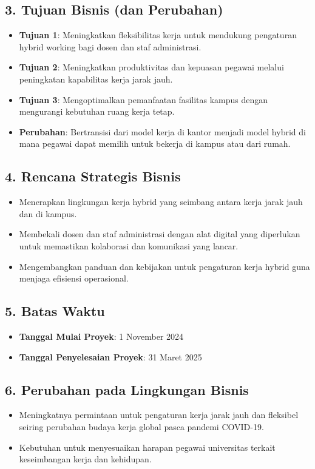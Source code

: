 \subsection*{3. Tujuan Bisnis (dan Perubahan)}
\begin{itemize}
	\item \textbf{Tujuan 1}: Meningkatkan fleksibilitas kerja untuk mendukung pengaturan hybrid working bagi dosen dan staf administrasi.
	\item \textbf{Tujuan 2}: Meningkatkan produktivitas dan kepuasan pegawai melalui peningkatan kapabilitas kerja jarak jauh.
	\item \textbf{Tujuan 3}: Mengoptimalkan pemanfaatan fasilitas kampus dengan mengurangi kebutuhan ruang kerja tetap.
	\item \textbf{Perubahan}: Bertransisi dari model kerja di kantor menjadi model hybrid di mana pegawai dapat memilih untuk bekerja di kampus atau dari rumah.
\end{itemize}

\subsection*{4. Rencana Strategis Bisnis}
\begin{itemize}
	\item Menerapkan lingkungan kerja hybrid yang seimbang antara kerja jarak jauh dan di kampus.
	\item Membekali dosen dan staf administrasi dengan alat digital yang diperlukan untuk memastikan kolaborasi dan komunikasi yang lancar.
	\item Mengembangkan panduan dan kebijakan untuk pengaturan kerja hybrid guna menjaga efisiensi operasional.
\end{itemize}

\subsection*{5. Batas Waktu}
\begin{itemize}
	\item \textbf{Tanggal Mulai Proyek}: 1 November 2024
	\item \textbf{Tanggal Penyelesaian Proyek}: 31 Maret 2025
\end{itemize}

\subsection*{6. Perubahan pada Lingkungan Bisnis}
\begin{itemize}
	\item Meningkatnya permintaan untuk pengaturan kerja jarak jauh dan fleksibel seiring perubahan budaya kerja global pasca pandemi COVID-19.
	\item Kebutuhan untuk menyesuaikan harapan pegawai universitas terkait keseimbangan kerja dan kehidupan.
\end{itemize}

